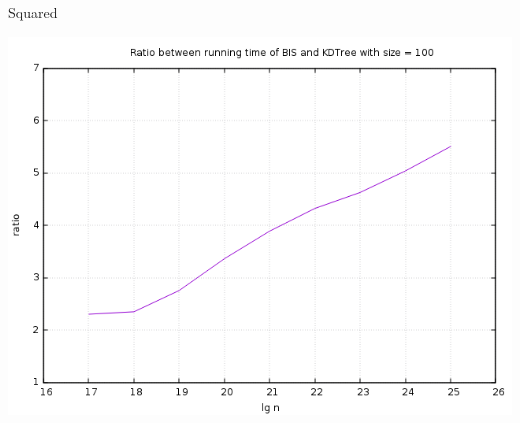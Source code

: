 \documentclass[pdf]{beamer}
\begin{document}
\begin{frame}{Squared}

  \includegraphics[scale=0.35]{pictures/analysis/factor_difference_sqrtn_100.png}

\end{frame}
\end{document}
